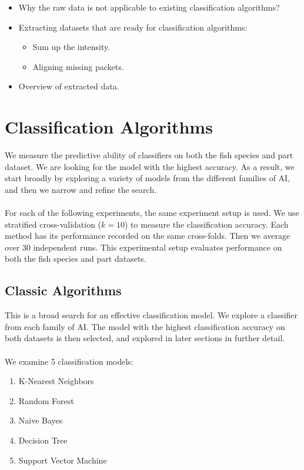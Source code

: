 \documentclass[runningheads]{llncs}
\begin{document}
\begin{itemize}
  \item Why the raw data is not applicable to existing classification algorithms?
  \item Extracting datasets that are ready for classification algorithms:
        \begin{itemize}
          \item Sum up the intensity.
          \item Aligning missing packets.
        \end{itemize}
  \item Overview of extracted data.
\end{itemize}

\section{Classification Algorithms}


We measure the predictive ability of classifiers on both the fish species and part dataset.
We are looking for the model with the highest accuracy.
As a result, we start broadly by exploring a variety of models from the different families of AI, and then we narrow and refine the search.
\\\\
For each of the following experiments, the same experiment setup is used.
We use stratified cross-validation ($k=10$) to measure the classification accuracy.
Each method has its performance recorded on the same cross-folds.
Then we average over 30 independent runs.
This experimental setup evaluates performance on both the fish species and part datasets.

\subsection{Classic Algorithms}

This is a broad search for an effective classification model.
We explore a classifier from each family of AI.
The model with the highest classification accuracy on both datasets is then selected, and explored in later sections in further detail.
\\\\
We examine 5 classification models:

\begin{enumerate}
  \item K-Nearest Neighbors \cite{fix1989discriminatory}
  \item Random Forest \cite{ho1995random}
  \item Naive Bayes \cite{hand2001idiot}
  \item Decision Tree \cite{loh2011classification}
  \item Support Vector Machine \cite{cortes1995support}
\end{enumerate}
\end{document}

